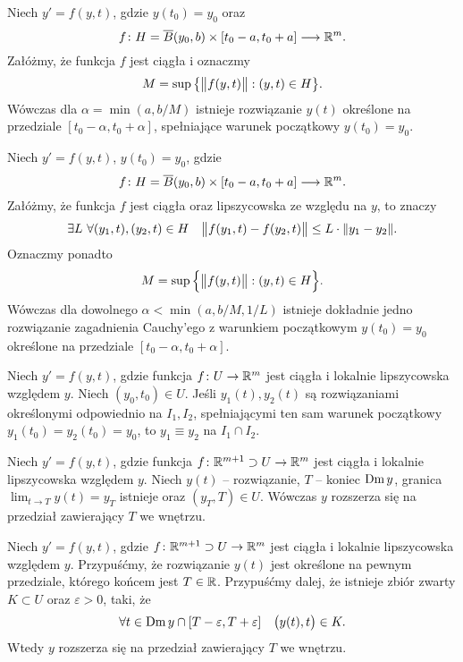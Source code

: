 \begin{theorem}[Peano]
  Niech $y' = f(y,t)$, gdzie $y(t_0) = y_0$ oraz
  \[
    f \colon H = \overline{B} (y_0, b) \times [t_0 - a, t_0 + a] \longrightarrow \R^m.
  \]
  Załóżmy, że funkcja $f$ jest ciągła i oznaczmy
  \[
    M = \sup \big\{ \norm[\big]{f(y,t)} : (y, t) \in H \big\}.
  \]
  Wówczas dla $\alpha = \min(a, b/M)$ istnieje rozwiązanie $y(t)$ określone na
  przedziale $[t_0 - \alpha, t_0 + \alpha]$, spełniające warunek początkowy $y(t_0) = y_0$.
\end{theorem}

\begin{theorem}
  Niech $y' = f(y,t)$, $y(t_0) = y_0$, gdzie
  \[
    f \colon H = \overline{B} (y_0, b) \times [t_0 - a, t_0 + a] \longrightarrow \R^m.
  \]
  Załóżmy, że funkcja $f$ jest ciągła oraz lipszycowska ze względu na $y$, to znaczy
  \[
    \exists L \ \forall (y_1,t), (y_2,t) \in H \quad
    \norm[\big]{f(y_1,t) - f(y_2,t)} \leq L \cdot \norm{y_1 - y_2}.
  \]
  Oznaczmy ponadto
  \[
    M = \sup \Big\{ \norm[\big]{f(y,t)} : (y, t) \in H \Big\}.
  \]
  Wówczas dla dowolnego $\alpha < \min(a, b/M, 1/L)$ istnieje dokładnie jedno rozwiązanie
  zagadnienia Cauchy'ego z warunkiem początkowym $y(t_0) = y_0$ określone na przedziale
  $[t_0 - \alpha, t_0 + \alpha]$.
\end{theorem}

\begin{lemma}
  Niech $y' = f(y,t)$, gdzie funkcja $f \colon U \to \R^m$ jest ciągła i lokalnie lipszycowska
  względem $y$. Niech $(y_0,t_0) \in U$. Jeśli $y_1(t), y_2(t)$ są rozwiązaniami określonymi
  odpowiednio na $I_1, I_2$, spełniającymi ten sam warunek początkowy $y_1(t_0) = y_2(t_0) = y_0$,
  to $y_1 \equiv y_2$ na $I_1 \cap I_2$.
\end{lemma}

\begin{lemma}
  Niech $y' = f(y,t)$, gdzie funkcja $f \colon \R^{m+1} \supset U \to \R^m$ jest ciągła i lokalnie
  lipszycowska względem $y$. Niech $y(t)$ -- rozwiązanie, $T$ -- koniec $\Dm y$, granica
  $\lim_{t \to T} y(t) = y_T$ istnieje oraz $(y_T, T) \in U$. Wówczas $y$ rozszerza się na przedział
  zawierający $T$ we wnętrzu.
\end{lemma}

\begin{theorem}
  Niech $y' = f(y,t)$, gdzie $f \colon \R^{m+1} \supset U \to \R^m$ jest ciągła i lokalnie
  lipszycowska względem $y$. Przypuśćmy, że rozwiązanie $y(t)$ jest określone na pewnym przedziale,
  którego końcem jest $T \in \R$. Przypuśćmy dalej, że istnieje zbiór zwarty $K \subset U$ oraz
  $\varepsilon > 0$, taki, że
  \[
    \forall t \in \Dm y \cap [T - \varepsilon, T + \varepsilon] \quad \p[\big]{y(t), t} \in K.
  \]
  Wtedy $y$ rozszerza się na przedział zawierający $T$ we wnętrzu.
\end{theorem}

